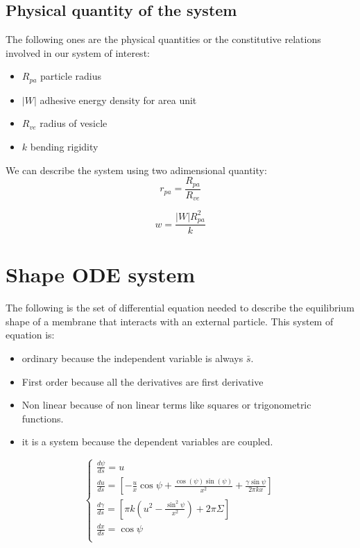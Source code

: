 \documentclass[12pt]{article}
\begin{document}
\subsection{Physical quantity of the system}
The following ones are the physical quantities or the constitutive relations involved in our system of interest:

\begin{itemize}
  \item $R_{pa}$ particle radius
  \item $|W|$ adhesive energy density for area unit
  \item $R_{ve}$ radius of vesicle
  \item $k$ bending rigidity
\end{itemize}

We can describe the system using two adimensional quantity:
$$
r_{pa} = \frac{R_{pa}}{R_{ve}}
$$

$$
w = \frac{|W| R_{pa}^2}{k}
$$

\section{Shape ODE system}
The following is the set of differential equation needed to describe the equilibrium shape of a membrane that interacts with an external particle. This system of equation is:
\begin{itemize}
    \item ordinary because the independent variable is always $\bar{s}$.
    \item First order because all the derivatives are first derivative
    \item Non linear because of non linear terms like squares or trigonometric functions.
    \item it is a system because the dependent variables are coupled.
\end{itemize}


\begin{equation}
  \begin{cases} 
    \frac{d\psi}{ds} =  u \\[3mm]
    \frac{du}{ds} =  [-\frac{u}{x}\cos\psi+\frac{\cos(\psi)\sin(\psi)}{x^2}+\frac{\gamma\sin \psi}{2\pi k x}] \\[3mm]
    \frac{d\gamma}{ds} =  [\pi k (u^2-\frac{\sin^2 \psi}{x^2})+2 \pi \Sigma] \\[3mm]
    \frac{dx}{ds} =  \cos \psi \\[3mm]
  \end{cases}
\end{equation}
\end{document}
